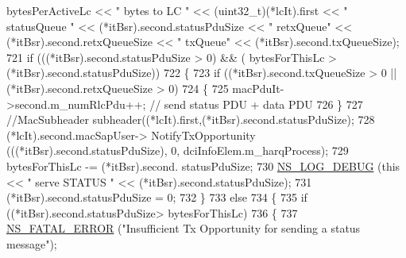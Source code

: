 \begin{DoxyCode}
      bytesPerActiveLc << \textcolor{stringliteral}{" bytes to LC "} << (uint32\_t)(*lcIt).first << \textcolor{stringliteral}{" statusQueue "} << (*itBsr).second.statusPduSize <<
       \textcolor{stringliteral}{" retxQueue"} << (*itBsr).second.retxQueueSize << \textcolor{stringliteral}{" txQueue"} <<  (*itBsr).second.txQueueSize);
721                                                         \textcolor{keywordflow}{if} (((*itBsr).second.statusPduSize > 0) && (
      bytesForThisLc > (*itBsr).second.statusPduSize))
722                                                         \{
723                                                                 \textcolor{keywordflow}{if} ((*itBsr).second.txQueueSize > 0 || 
      (*itBsr).second.retxQueueSize > 0)
724                                                                 \{
725                                                                         macPduIt->second.m\_numRlcPdu++;         \textcolor{comment}{
      // send status PDU + data PDU}
726                                                                 \}
727                                                                 \textcolor{comment}{//MacSubheader
       subheader((*lcIt).first,(*itBsr).second.statusPduSize);}
728                                                                 (*lcIt).second.macSapUser->
      NotifyTxOpportunity (((*itBsr).second.statusPduSize), 0, dciInfoElem.m\_harqProcess);
729                                                                 bytesForThisLc -= (*itBsr).second.
      statusPduSize;
730                                                                 \hyperlink{group__logging_ga413f1886406d49f59a6a0a89b77b4d0a}{NS\_LOG\_DEBUG} (\textcolor{keyword}{this} << \textcolor{stringliteral}{" serve
       STATUS "} << (*itBsr).second.statusPduSize);
731                                                                 (*itBsr).second.statusPduSize = 0;
732                                                         \}
733                                                         \textcolor{keywordflow}{else}
734                                                         \{
735                                                                 \textcolor{keywordflow}{if} ((*itBsr).second.statusPduSize>
      bytesForThisLc)
736                                                                 \{
737                                                                         
      \hyperlink{group__fatal_ga5131d5e3f75d7d4cbfd706ac456fdc85}{NS\_FATAL\_ERROR} (\textcolor{stringliteral}{"Insufficient Tx Opportunity for sending a status message"});

\end{DoxyCode}
